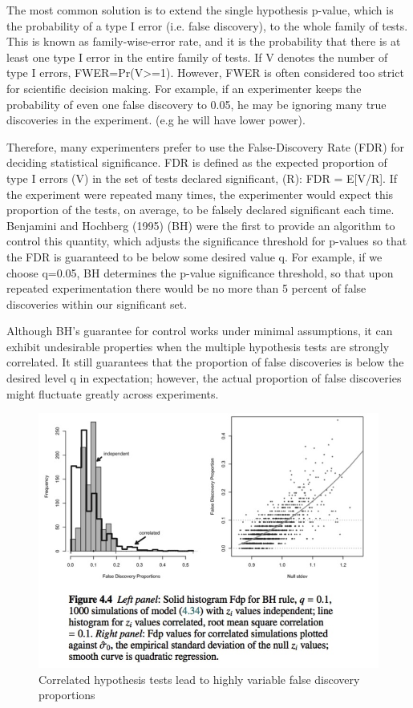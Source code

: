\documentclass[11pt,notitlepage]{article}
\begin{document}
The most common solution is to extend the single hypothesis p-value, which is the probability of a type I error (i.e. false discovery), to the whole family of tests. This is known as family-wise-error rate, and it is the probability that there is at least one type I error in the entire family of tests. If V denotes the number of type I errors, FWER=Pr(V>=1). However, FWER is often considered too strict for scientific decision making. For example, if an experimenter keeps the probability of even one false discovery to 0.05, he may be ignoring many true discoveries in the experiment. (e.g he will have lower power). 

Therefore, many experimenters prefer to use the False-Discovery Rate (FDR) for deciding statistical significance. FDR is defined as the expected proportion of type I errors (V) in the set of tests declared significant, (R): FDR = E[V/R]. If the experiment were repeated many times, the experimenter would expect this proportion of the tests, on average, to be falsely declared significant each time. Benjamini and Hochberg (1995) (BH) were the first to provide an algorithm to control this quantity, which adjusts the significance threshold for p-values so that the FDR is guaranteed to be below some desired value q. For example, if we choose q=0.05, BH determines the p-value significance threshold, so that upon repeated experimentation there would be no more than 5 percent of false discoveries within our significant set. 




Although BH's guarantee for control works under minimal assumptions, it can exhibit undesirable properties when the multiple hypothesis tests are strongly correlated. It still guarantees that the proportion of false discoveries is below the desired level q in expectation; however, the actual proportion of false discoveries might fluctuate greatly across experiments. 

\begin{figure} %
\includegraphics[scale=0.45]{Figures/Slide1.jpg}
\caption{\footnotesize Correlated hypothesis tests lead to highly variable false discovery proportions}
\end{figure}
\end{document}
